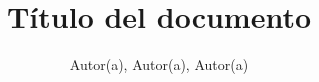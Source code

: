 \documentclass[stu, 12pt, letterpaper, donotrepeattitle, floatsintext]{apa7}
\title{\Large Título del documento}
\author{Autor(a), Autor(a), Autor(a)} %
\affiliation{Nombre de la institución}
\begin{document}
\maketitle


\tableofcontents
\setcounter{tocdepth}{2}
\newpage
\listoftables
\newpage
\listoffigures
\newpage

\setcounter{page}{2}



\newpage
\renewcommand\refname{\large\textbf{Referencias Bibliográficas}}
\printbibliography
\end{document}
